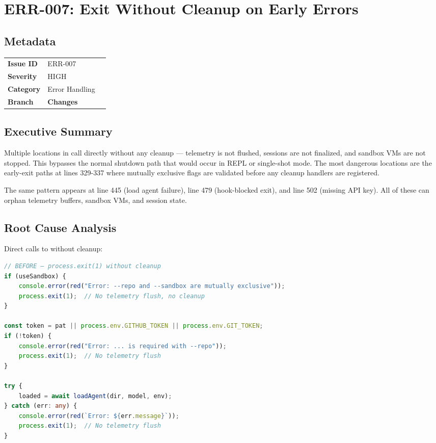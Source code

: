 \section{ERR-007: Exit Without Cleanup on Early Errors}
\label{sec:err-007}
\subsection*{Metadata}
\begin{tabular}{ll}
\textbf{Issue ID} & ERR-007 \\
\textbf{Severity} & HIGH \\
\textbf{Category} & Error Handling \\
\textbf{Branch} & 
\textbf{Changes} &  \\
\end{tabular}

\subsection*{Executive Summary}
Multiple locations in  call  directly without any cleanup — telemetry is not flushed, sessions are not finalized, and sandbox VMs are not stopped. This bypasses the normal shutdown path that would occur in REPL or single-shot mode. The most dangerous locations are the early-exit paths at lines 329-337 where mutually exclusive flags are validated before any cleanup handlers are registered.

The same pattern appears at line 445 (load agent failure), line 479 (hook-blocked exit), and line 502 (missing API key). All of these can orphan telemetry buffers, sandbox VMs, and session state.

\subsection*{Root Cause Analysis}
Direct calls to  without cleanup:

\begin{lstlisting}[language=TypeScript]
// BEFORE — process.exit(1) without cleanup
if (useSandbox) {
    console.error(red("Error: --repo and --sandbox are mutually exclusive"));
    process.exit(1);  // No telemetry flush, no cleanup
}

const token = pat || process.env.GITHUB_TOKEN || process.env.GIT_TOKEN;
if (!token) {
    console.error(red("Error: ... is required with --repo"));
    process.exit(1);  // No telemetry flush
}

try {
    loaded = await loadAgent(dir, model, env);
} catch (err: any) {
    console.error(red(`Error: ${err.message}`));
    process.exit(1);  // No telemetry flush
}
\end{lstlisting}

